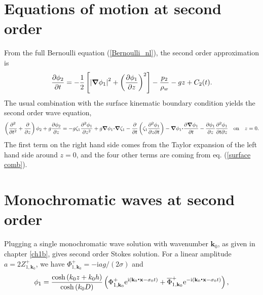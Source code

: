 \section{Equations of motion at second order}
From the full Bernoulli equation (\ref{Bernoulli_nl}), the second order approximation is 
 \begin{equation}
    \frac{\partial \phi_2}{\partial t} =
    -\frac{1}{2}\left[
    \left|\mbox{\boldmath $\nabla$} \phi_1\right|^2
    +\left(\frac{\partial \phi_1}{\partial z}\right)^2
    \right]
    -\frac{p_2}{\rho_w}-g z + C_2(t).\label{Bernoulli2}
\end{equation}
The usual combination with the surface kinematic boundary condition yields the second order wave equation,
\begin{equation}
\left(\frac{\partial ^{2}}{\partial t^{2}} +  \frac{\partial  }{\partial z} \right) \phi_2
    +g \frac{\partial \phi_2 }{\partial z}=- g \zeta_1 \frac{\partial^2 \phi_1 }{\partial z^2} + g \bnabla\phi_1 \bcdot\bnabla \zeta_1-\frac{\partial}{\partial
t} \left( \zeta_1 \frac{\partial^2 \phi_1}{\partial z \partial t}\right) -\bnabla \phi_1 \bcdot%
    \frac{\partial \bnabla \phi_1 }{\partial t}- \frac{\partial \phi_1 }{%
    \partial z}\frac{\partial ^{2}\phi_1 }{\partial t\partial z}\nonumber\\
    \quad \mathrm{on} \quad z=0 .  \label{surface_2b}
\end{equation}
The first term on the right hand side comes from the Taylor expansion of the left hand side around  $z=0$, 
and the four other terms are coming from eq. (\ref{surface comb}).




\section{Monochromatic waves at second order}
Plugging a single monochromatic wave solution with wavenumber ${\mathbf k}_0$, as given in chapter \ref{ch1b}, gives 
second order Stokes solution. For a linear amplitude $a=2 Z_{1,{\mathbf k}_0}^{+}$, we have  $\Phi _{1,{\mathbf
k}_0}^+=-\mathrm{i}a g/\left(2\sigma\right)$ and
\begin{equation}
    \phi_1=\frac{\cosh\left(k_0 z+k_0 h\right)}{\cosh\left(k_0 D\right)}
    \left(\Phi _{1,{\mathbf k}_0}^+
    \mathrm{e}^{\mathrm{i}\left(\mathbf{k}_0\mbox{\boldmath $\cdot$}{\mathbf x}-\sigma_0 t\right)}
    +\overline{\Phi}_{1,{\mathbf k}_0}^+
\mathrm{e}^{-\mathrm{i}\left(\mathbf{k}_0\mbox{\boldmath $\cdot$}{\mathbf
x}-\sigma_0 t\right)}\right),
\end{equation}

